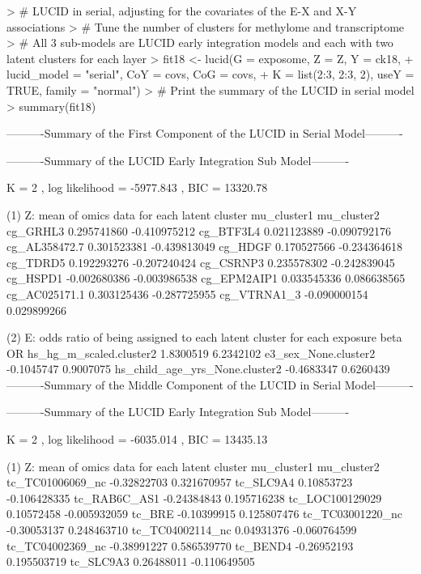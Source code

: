 \begin{example}
> # LUCID in serial, adjusting for the covariates of the E-X and X-Y associations
> # Tune the number of clusters for methylome and transcriptome
> # All 3 sub-models are LUCID early integration models and each with two latent clusters for each layer
> fit18 <- lucid(G = exposome, Z = Z, Y = ck18,
+                lucid_model = "serial", CoY = covs, CoG = covs,
+                K = list(2:3, 2:3, 2), useY = TRUE, family = "normal")
> # Print the summary of the LUCID in serial model
> summary(fit18)

----------Summary of the First Component of the LUCID in Serial Model----------

----------Summary of the LUCID Early Integration Sub Model----------

K =  2 , log likelihood = -5977.843 , BIC =  13320.78

(1) Z: mean of omics data for each latent cluster
               mu_cluster1  mu_cluster2
cg_GRHL3       0.295741860 -0.410975212
cg_BTF3L4      0.021123889 -0.090792176
cg_AL358472.7  0.301523381 -0.439813049
cg_HDGF        0.170527566 -0.234364618
cg_TDRD5       0.192293276 -0.207240424
cg_CSRNP3      0.235578302 -0.242839045
cg_HSPD1      -0.002680386 -0.003986538
cg_EPM2AIP1    0.033545336  0.086638565
cg_AC025171.1  0.303125436 -0.287725955
cg_VTRNA1_3   -0.090000154  0.029899266

(2) E: odds ratio of being assigned to each latent cluster for each exposure
                                     beta        OR
hs_hg_m_scaled.cluster2         1.8300519 6.2342102
e3_sex_None.cluster2           -0.1045747 0.9007075
hs_child_age_yrs_None.cluster2 -0.4683347 0.6260439
----------Summary of the Middle Component of the LUCID in Serial Model----------

----------Summary of the LUCID Early Integration Sub Model----------

K =  2 , log likelihood = -6035.014 , BIC =  13435.13

(1) Z: mean of omics data for each latent cluster
                 mu_cluster1  mu_cluster2
tc_TC01006069_nc -0.32822703  0.321670957
tc_SLC9A4         0.10853723 -0.106428335
tc_RAB6C_AS1     -0.24384843  0.195716238
tc_LOC100129029   0.10572458 -0.005932059
tc_BRE           -0.10399915  0.125807476
tc_TC03001220_nc -0.30053137  0.248463710
tc_TC04002114_nc  0.04931376 -0.060764599
tc_TC04002369_nc -0.38991227  0.586539770
tc_BEND4         -0.26952193  0.195503719
tc_SLC9A3         0.26488011 -0.110649505


\end{example}
